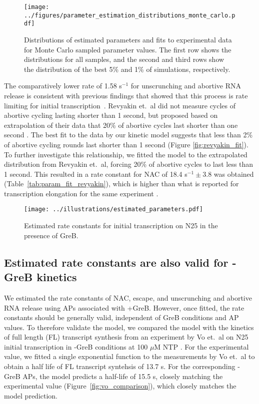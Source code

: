 \begin{figure}
	\begin{center}
      \texttt{[image: ../figures/parameter\_estimation\_distributions\_monte\_carlo.pdf]}
	\end{center}
    \caption{Distributions of estimated parameters and fits to experimental
      data for Monte Carlo sampled parameter values.  The first row shows the
      distributions for all samples, and the second and third rows show the
      distribution of the best 5\% and 1\% of simulations, respectively.}
      \label{fig:parameter_estimation_1}
\end{figure}

The comparatively
lower rate of 1.58 s$^{-1}$ for unscrunching and abortive RNA release is
consistent with previous findings that showed that this process is rate
limiting for initial transcription~\cite{margeat_direct_2006,
revyakin_abortive_2006}. Revyakin et.\ al did not measure cycles of abortive
cycling lasting shorter than 1 second, but proposed based on extrapolation of
their data that 20\% of abortive cycles last shorter than one second
\cite{revyakin_abortive_2006}.  The best fit to the data by our kinetic model
suggests that less than 2\% of abortive cycling rounds last shorter than 1
second (Figure \ref{fig:revyakin_fit}). To further investigate this
relationship, we fitted the model to the extrapolated distribution from
Revyakin et.\ al, forcing 20\% of abortive cycles to last less than 1 second.
This resulted in a rate constant for NAC of 18.4 s$^{-1} \pm 3.8$ was obtained
(Table~\ref{tab:param_fit_revyakin}), which is higher than what is reported
for transcription elongation for the same experiment
\cite{revyakin_abortive_2006}.

\begin{figure}
	\begin{center}
      \texttt{[image: ../illustrations/estimated\_parameters.pdf]}
	\end{center}
    \caption{Estimated rate constants for initial transcription on N25 in the
      presence of GreB.}
    \label{fig:estimated_parameters}
\end{figure}

\subsection{Estimated rate constants are also valid for -GreB kinetics}
We estimated the rate constants of NAC, escape, and unscrunching and abortive
RNA release using APs associated with +GreB. However, once fitted, the rate
constants should be generally valid, independent of GreB conditions and AP
values. To therefore validate the model, we compared the model with the
kinetics of full length (FL) transcript synthesis from an experiment by Vo
et.\ al on N25 initial transcription in -GreB conditions at 100 $\mu$M NTP
\cite{vo_vitro_2003-1}. For the experimental value, we fitted a single
exponential function to the measurements by Vo et.\ al to obtain a half life
of FL transcript syntehsis of 13.7 s. For the corresponding -GreB APs, the
model predicts a half-life of 15.5 s, closely matching the experimental value
(Figure~\ref{fig:vo_comparison}), which closely matches the model prediction.


